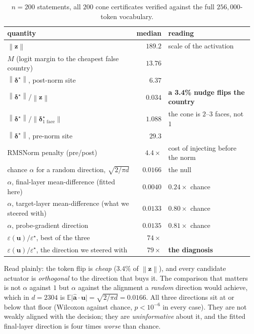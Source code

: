 \documentclass[11pt]{article}
\newcommand{\vz}{\bm{z}}
\newcommand{\va}{\bm{a}}
\newcommand{\vd}{\bm{\delta}}
\newcommand{\vu}{\bm{u}}
\newcommand{\norm}[1]{\left\lVert #1 \right\rVert}
\begin{document}
\begin{table}[h]\centering
\small
\begin{tabular}{@{}lrl@{}}
\toprule
quantity & median & reading \\
\midrule
$\norm{\vz}$ & $189.2$ & scale of the activation \\
$M$ (logit margin to the cheapest false country) & $13.76$ & \\
$\norm{\vd^\star}$, post-norm site & $6.37$ & \\
$\norm{\vd^\star}/\norm{\vz}$ & $0.034$ & \textbf{a 3.4\% nudge flips the country} \\
$\norm{\vd^\star}/\norm{\vd^\star_{\text{1 face}}}$ & $1.088$ & the cone is $2$--$3$ faces, not $1$ \\
$\norm{\vd^\star}$, pre-norm site & $29.3$ & \\
RMSNorm penalty (pre/post) & $4.4\times$ & cost of injecting before the norm \\
\midrule
chance $\alpha$ for a random direction, $\sqrt{2/\pi d}$ & $0.0166$ & the null \\
$\alpha$, final-layer mean-difference (fitted here) & $0.0040$ & $0.24\times$ chance \\
$\alpha$, target-layer mean-difference (what we steered with) & $0.0133$ & $0.80\times$ chance \\
$\alpha$, probe-gradient direction & $0.0135$ & $0.81\times$ chance \\
$\varepsilon(\vu)/\varepsilon^\star$, best of the three & $74\times$ & \\
$\varepsilon(\vu)/\varepsilon^\star$, the direction we steered with & $79\times$ &
  \textbf{the diagnosis} \\
\bottomrule
\end{tabular}
\caption{$n = 200$ statements, all $200$ cone certificates verified against the full
$256{,}000$-token vocabulary.}
\end{table}

Read plainly: the token flip is \emph{cheap} ($3.4\%$ of $\norm{\vz}$), and every
candidate actuator is \emph{orthogonal} to the direction that buys it. The comparison
that matters is not $\alpha$ against $1$ but $\alpha$ against the alignment a
\emph{random} direction would achieve, which in $d = 2304$ is
$\mathbb{E}\lvert\hat{\va}\cdot\vu\rvert = \sqrt{2/\pi d} = 0.0166$. All three
directions sit at or below that floor (Wilcoxon against chance, $p < 10^{-6}$ in every
case). They are not weakly aligned with the decision; they are \emph{uninformative}
about it, and the fitted final-layer direction is four times \emph{worse} than chance.
\end{document}
